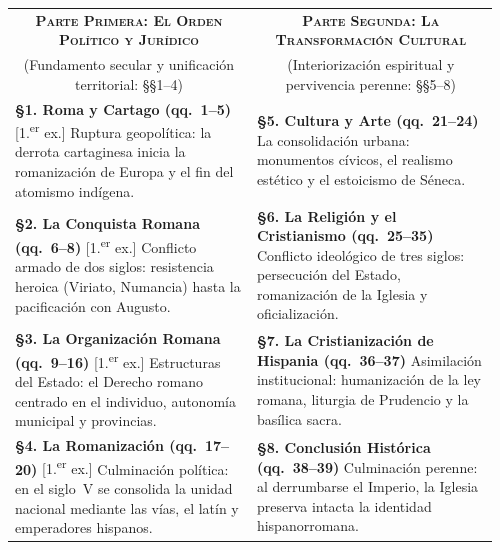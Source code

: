 \documentclass[11pt,letterpaper]{article}
\begin{document}
\begin{center}
\small
\begin{tabularx}{\linewidth}{@{}p{0.48\linewidth}@{\hspace{0.04\linewidth}}p{0.48\linewidth}@{}}
  \toprule
  \multicolumn{1}{c}{\textbf{\textsc{Parte Primera: El Orden Político y Jurídico}}} & 
  \multicolumn{1}{c}{\textbf{\textsc{Parte Segunda: La Transformación Cultural}}} \\
  \multicolumn{1}{c}{\footnotesize\color{goodingSlate}(Fundamento secular y unificación territorial: §§1--4)} & 
  \multicolumn{1}{c}{\footnotesize\color{goodingSlate}(Interiorización espiritual y pervivencia perenne: §§5--8)} \\
  \midrule
  \textbf{\S1. Roma y Cartago (qq.~1--5)} \hfill {\scriptsize\color{goodingCrimson}[1.\textsuperscript{er} ex.]}\newline
  Ruptura geopolítica: la derrota cartaginesa inicia la romanización de Europa y el fin del atomismo indígena. &
  \textbf{\S5. Cultura y Arte (qq.~21--24)}\newline
  La consolidación urbana: monumentos cívicos, el realismo estético y el estoicismo de Séneca. \\
  \addlinespace[0.6em]
  \textbf{\S2. La Conquista Romana (qq.~6--8)} \hfill {\scriptsize\color{goodingCrimson}[1.\textsuperscript{er} ex.]}\newline
  Conflicto armado de dos siglos: resistencia heroica (Viriato, Numancia) hasta la pacificación con Augusto. &
  \textbf{\S6. La Religión y el Cristianismo (qq.~25--35)}\newline
  Conflicto ideológico de tres siglos: persecución del Estado, romanización de la Iglesia y oficialización. \\
  \addlinespace[0.6em]
  \textbf{\S3. La Organización Romana (qq.~9--16)} \hfill {\scriptsize\color{goodingCrimson}[1.\textsuperscript{er} ex.]}\newline
  Estructuras del Estado: el Derecho romano centrado en el individuo, autonomía municipal y provincias. &
  \textbf{\S7. La Cristianización de Hispania (qq.~36--37)}\newline
  Asimilación institucional: humanización de la ley romana, liturgia de Prudencio y la basílica sacra. \\
  \addlinespace[0.6em]
  \textbf{\S4. La Romanización (qq.~17--20)} \hfill {\scriptsize\color{goodingCrimson}[1.\textsuperscript{er} ex.]}\newline
  Culminación política: en el siglo~V se consolida la unidad nacional mediante las vías, el latín y emperadores hispanos. &
  \textbf{\S8. Conclusión Histórica (qq.~38--39)}\newline
  Culminación perenne: al derrumbarse el Imperio, la Iglesia preserva intacta la identidad hispanorromana. \\
  \bottomrule
\end{tabularx}
\end{center}
\end{document}
